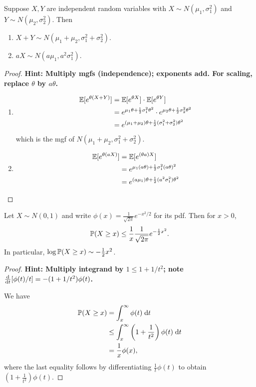 \documentclass[a4paper]{article}
\begin{document}
\begin{thm}
  Suppose $X, Y$ are independent random variables with $X\sim N(\mu_1, \sigma_1^2)$ and $Y\sim N(\mu_2, \sigma_2^2)$. Then
  \begin{enumerate}
    \item $X + Y \sim N(\mu_1 + \mu_2 , \sigma_1^2 + \sigma_2^2)$.
    \item $aX \sim N(a\mu_1, a^2 \sigma_1^2)$.
  \end{enumerate}
\end{thm}

\begin{proof}
  \textbf{Hint: Multiply mgfs (independence); exponents add. For scaling, replace $\theta$ by $a\theta$.}
\leavevmode
  \begin{enumerate}
    \item
      \begin{align*}
        \E[e^{\theta(X + Y)}] &= \E[e^{\theta X}] \cdot \E[e^{\theta Y}]\\
        &= e^{\mu_1 \theta + \frac{1}{2}\sigma_1^2\theta^2} \cdot e^{\mu_2 \theta + \frac{1}{2}\sigma_2^2 \theta^2}\\
        &= e^{(\mu_1 + \mu_2)\theta + \frac{1}{2}(\sigma_1^2 + \sigma_2^2)\theta^2}
      \end{align*}
      which is the mgf of $N(\mu_1 + \mu_2, \sigma_1^2 + \sigma_2^2)$.
    \item
      \begin{align*}
        \E[e^{\theta (aX)}] &= \E[e^{(\theta a)X}]\\
        &= e^{\mu_1(a\theta) + \frac{1}{2}\sigma_1^2 (a \theta)^2}\\
        &= e^{(a\mu_1)\theta + \frac{1}{2}(a^2\sigma_1^2)\theta^2}\qedhere
      \end{align*}%
  \end{enumerate}
\end{proof}

\begin{prop}
  Let $X \sim N(0,1)$ and write $\phi(x) = \frac{1}{\sqrt{2\pi}} e^{-x^2/2}$ for its pdf. Then for $x > 0$,
  \[
    \P(X \geq x) \leq \frac{1}{x}\frac{1}{\sqrt{2\pi}}e^{-\frac{1}{2}x^2}.
  \]
  In particular, $\log \P(X \geq x) \sim -\frac{1}{2}x^2$.
\end{prop}

\begin{proof}
  \textbf{Hint: Multiply integrand by $1 \leq 1 + 1/t^2$; note $\frac{\d}{\d t}[\phi(t)/t] = -(1 + 1/t^2)\phi(t)$.}

  We have
  \begin{align*}
    \P(X \geq x) &= \int_x^\infty \phi(t)\;\d t\\
    &\leq \int_x^\infty \left(1 + \frac{1}{t^2}\right)\phi(t)\;\d t \\
    &= \frac{1}{x}\phi(x),
  \end{align*}
  where the last equality follows by differentiating $\frac{1}{t}\phi(t)$ to obtain $\left(1 + \frac{1}{t^2}\right)\phi(t)$.
\end{proof}
\end{document}
